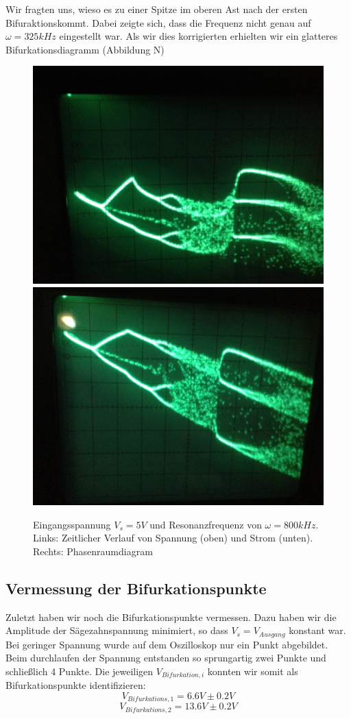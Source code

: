 \documentclass{scrartcl}
\begin{document}
Wir fragten uns, wieso es zu einer Spitze im oberen Ast nach der ersten Bifuraktionskommt. Dabei zeigte sich, dass die Frequenz nicht genau auf  $\omega=325kHz$ eingestellt war. Als wir dies korrigierten erhielten wir ein glatteres Bifurkationsdiagramm (Abbildung N)

\begin{figure}
\centering
\includegraphics[scale=0.18]{bif-ldr/bifurc-bad}
\includegraphics[scale=0.18]{bif-ldr/bifurc-good}
\caption{Eingangsspannung $V_s=5V$ und Resonanzfrequenz von $\omega=800kHz$. Links: Zeitlicher Verlauf von Spannung (oben) und Strom (unten). Rechts: Phasenraumdiagram}
\label{fig:ldr-bifurc}
\end{figure}
\subsection { Vermessung der Bifurkationspunkte }
Zuletzt haben wir noch die Bifurkationspunkte vermessen. Dazu haben wir die Amplitude der Sägezahnspannung minimiert, so dass $V_s=V_{Ausgang}$ konstant war. Bei geringer Spannung wurde auf dem Oszilloskop nur ein Punkt abgebildet. Beim durchlaufen der Spannung entstanden so sprungartig zwei Punkte und schließlich 4 Punkte. Die jeweiligen $V_{Bifurkation, i}$ konnten wir somit als Bifurkationspunkte identifizieren: 
$$V_{Bifurkations, 1}=6.6V \pm 0.2V$$
$$V_{Bifurkations, 2}=13.6V \pm 0.2V$$
\end{document}
